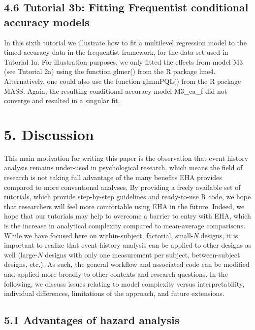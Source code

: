 \documentclass[
  man,floatsintext]{apa6}
\begin{document}
\subsection{4.6 Tutorial 3b: Fitting Frequentist conditional accuracy models}\label{tutorial-3b-fitting-frequentist-conditional-accuracy-models}

In this sixth tutorial we illustrate how to fit a multilevel regression model to the timed accuracy data in the frequentist framework, for the data set used in Tutorial 1a. For illustration purposes, we only fitted the effects from model M3 (see Tutorial 2a) using the function glmer() from the R package lme4. Alternatively, one could also use the function glmmPQL() from the R package MASS. Again, the resulting conditional accuracy model M3\_ca\_f did not converge and resulted in a singular fit.

\section{5. Discussion}\label{discussion}

This main motivation for writing this paper is the observation that event history analysis remains under-used in psychological research, which means the field of research is not taking full advantage of the many benefits EHA provides compared to more conventional analyses. By providing a freely available set of tutorials, which provide step-by-step guidelines and ready-to-use R code, we hope that researchers will feel more comfortable using EHA in the future. Indeed, we hope that our tutorials may help to overcome a barrier to entry with EHA, which is the increase in analytical complexity compared to mean-average comparisons. While we have focused here on within-subject, factorial, small-\emph{N} designs, it is important to realize that event history analysis can be applied to other designs as well (large-\emph{N} designs with only one measurement per subject, between-subject designs, etc.). As such, the general workflow and associated code can be modified and applied more broadly to other contexts and research questions. In the following, we discuss issues relating to model complexity versus interpretability, individual differences, limitations of the approach, and future extensions.

\subsection{5.1 Advantages of hazard analysis}\label{advantages-of-hazard-analysis}
\end{document}
